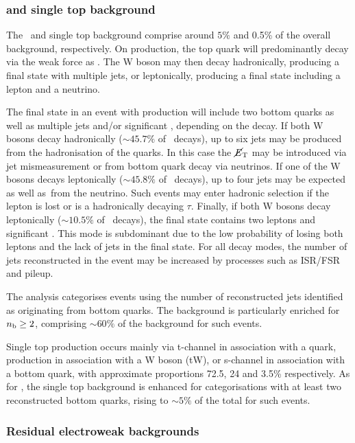 \subsubsection{\ttj and single top background}
The \ttj~and single top background comprise around $5\%$ and 0.5\% of the overall
background, respectively. On production, the top quark will predominantly decay via the 
weak force as \twb. The W boson may then decay hadronically, producing a final state
with multiple jets, or leptonically, producing a final state including a lepton and a neutrino. 

The final state in an event with \ttj production will include two bottom quarks as well as multiple 
jets and/or significant \met, depending on the decay. If both W bosons decay hadronically ($\sim45.7\%$ of \ttbar~decays),
up to six jets may be produced from the hadronisation of the quarks. In this case the $\mbox{$\cancel{E}_\text{T}$}$
may be introduced via jet mismeasurement or from bottom quark decay via neutrinos. If one of the 
W bosons decays leptonically ($\sim45.8\%$ of \ttbar~decays), up to four jets may be expected
as well as~\met from the neutrino. Such events may enter hadronic selection if the lepton is lost or is
a hadronically decaying $\tau$.
Finally, if both W bosons decay leptonically ($\sim10.5\%$ of \ttbar~decays), the final state contains two 
leptons and significant \met. This mode is subdominant due to the low probability of losing both leptons
and the lack of jets in the final state. For all decay modes, the number of jets reconstructed in the event
may be increased by processes such as ISR/FSR and pileup.

The \alphat analysis categorises events using the number of reconstructed 
jets identified as originating from bottom quarks. The \ttbar background is particularly
enriched for $n_{\mathrm{b}} \ge 2$, comprising $\sim60\%$ of the background for such events.

Single top production occurs mainly via t-channel in association with a quark, production in 
association with a W boson (tW), or s-channel in association with a bottom quark, with approximate
proportions 72.5, 24 and 3.5\% respectively. As for \ttj, the single top background is enhanced for 
categorisations with at least two reconstructed bottom quarks, rising to $\sim5\%$ of the total for
such events.

\subsubsection{Residual electroweak backgrounds}

